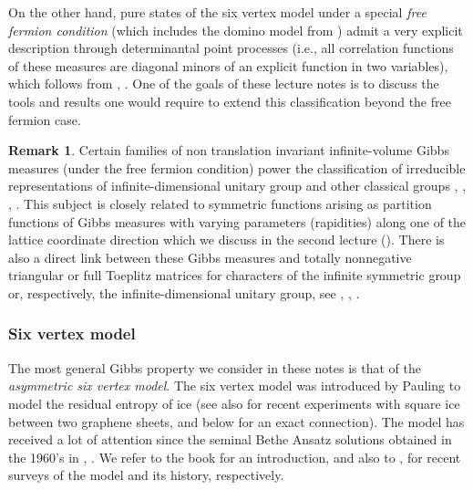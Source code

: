 \documentclass[letterpaper,11pt,oneside,reqno]{article}
\numberwithin{equation}{section}
\theoremstyle{definition}
\newtheorem{remark}[proposition]{Remark}
\theoremstyle{remark}
\begin{document}
On the other hand, pure states of the six vertex model 
under a special
\emph{free fermion condition}
(which includes the domino model from )
admit a very explicit description through
determinantal point processes 
(i.e., all correlation functions
of these measures are diagonal minors
of an explicit function in two variables),
which follows from
\cite{Sheffield2008}, 
\cite{KOS2006}.
One of the goals of these lecture notes is to discuss 
the tools and results one would require to extend this classification
beyond the free fermion case.


\begin{remark}
	\label{rmk:inf_Gibbs}
	Certain families of 
	non translation invariant
	infinite-volume
	Gibbs measures (under the free fermion condition)
	power the
	classification of irreducible representations of
	infinite-dimensional unitary group
	and other classical groups
	\cite{Voiculescu1976},
	\cite{VK82CharactersU},
	\cite{BorodinOlsh2011GT},
	\cite{Petrov2012GT}.
	This subject is closely related to symmetric
	functions arising as partition functions
	of Gibbs measures with 
	varying parameters (rapidities)
	along one of the lattice coordinate
	direction which we discuss in the second lecture ().
	There is also a direct link between these Gibbs measures and totally nonnegative triangular or
	full Toeplitz matrices for characters of the infinite
	symmetric group or, respectively, the
	infinite-dimensional unitary group, see \cite{AESW51},
	\cite{Edrei53}, \cite{Boyer1983}.
\end{remark}

\subsubsection{Six vertex model}
\label{subsub:6v_model}

The most general Gibbs property we consider in these notes is that of the 
\emph{asymmetric six vertex model}. 
The six vertex model 
was introduced by Pauling to model
the residual entropy of ice \cite{pauling1935structure}
(see also 
\cite{Nature_square_ice}
for recent experiments
with square ice between two graphene sheets, and  below for an exact connection).
The model
has received a lot of attention since the seminal Bethe Ansatz solutions obtained in the 1960's in
\cite{Lieb1967SixVertex}, \cite{YangYang1966}.
We refer to the book 
\cite{baxter2007exactly} for an introduction, and also to
\cite{reshetikhin2010lectures}, \cite{BramwellHarris2020} for recent surveys of the 
model and its history, respectively.
\end{document}

